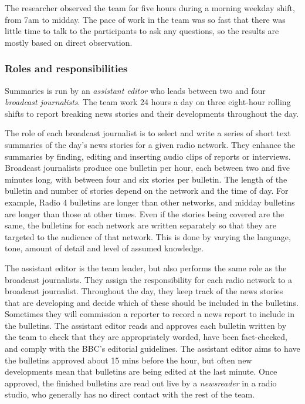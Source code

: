 The researcher observed the team for five hours during a morning weekday shift, from 7am to midday. The pace of work in
the team was so fast that there was little time to talk to the participants to ask any questions, so the results are
mostly based on direct observation.

\subsubsection{Roles and responsibilities}\label{sec:news-roles}
Summaries is run by an \textit{assistant editor} who leads between two and four \textit{broadcast journalists}. The
team work 24 hours a day on three eight-hour rolling shifts to report breaking news stories and their developments
throughout the day.

The role of each broadcast journalist is to select and write a series of short text summaries of the day's news stories
for a given radio network.  They enhance the summaries by finding, editing and inserting audio clips of reports
or interviews.  Broadcast journalists produce one bulletin per hour, each between two and five minutes long, with between
four and six stories per bulletin.  The length of the bulletin and number of stories depend on the network and the time
of day. For example, Radio 4 bulletins are longer than other networks, and midday bulletins are longer than those at
other times. Even if the stories being covered are the same, the bulletins for each network are written separately so
that they are targeted to the audience of that network.  This is done by varying the language, tone, amount of detail
and level of assumed knowledge.

The assistant editor is the team leader, but also performs the same role as the broadcast journalists. They assign the
responsibility for each radio network to a broadcast journalist. Throughout the day, they keep track of the news
stories that are developing and decide which of these should be included in the bulletins. Sometimes they will
commission a reporter to record a news report to include in the bulletins. The assistant editor reads and approves each
bulletin written by the team to check that they are appropriately worded, have been fact-checked, and comply with the
BBC's editorial guidelines.  The assistant editor aims to have the bulletins approved about 15 mins before the hour,
but often new developments mean that bulletins are being edited at the last minute.  Once approved, the finished
bulletins are read out live by a \textit{newsreader} in a radio studio, who generally has no direct contact with the
rest of the team.

